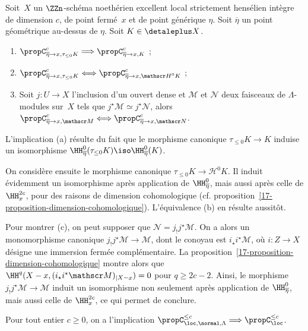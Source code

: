 \documentclass[10pt]{../fichiers-configuration-latex/smfart}
\begin{document}
\begin{lemme2}\label{17-lemme-propriete-c-reductions}
Soit $X$ un $\ZZn$-schéma noethérien excellent local strictement hensélien
intègre de dimension $c$,
de point fermé $x$ et de point générique $\eta$. Soit $\overline
\eta$ un point géométrique au-dessus de $\eta$. Soit $K\in\detaleplus X$.
\begin{enumerate}
\item[(a)] $\propC^c_{\overline\eta\to x,\tau_{\leq 0}K}\Longrightarrow
\propC^c_{\overline\eta\to x,K}$ ;
\item[(b)] $\propC^c_{\overline\eta\to x,\tau_{\leq 0}K}\Longleftrightarrow
\propC^c_{\overline\eta\to x,{\mathscr H}^0K}$ ;
\item[(c)] Soit $j\colon U\to X$ l'inclusion d'un ouvert dense
et $\mathscr M$ et $\mathscr N$ deux faisceaux de
$\Lambda$-modules sur $X$ tels que $j^\star \mathscr M\simeq j^\star
\mathscr N$, alors 
$\propC^c_{\overline\eta\to x,\mathscr M}\Longleftrightarrow
\propC^c_{\overline\eta\to x,\mathscr N}$.
\end{enumerate}
\end{lemme2}

L'implication (a) résulte du fait que le morphisme canonique $\tau_{\leq
0}K\to K$ induise un isomorphisme $\HH^0_{\overline \eta}(\tau_{\leq
0}K)\iso \HH^0_{\overline \eta}(K)$.

On considère ensuite le morphisme canonique
$\tau_{\leq 0}K\to {\mathscr H}^0 K$. Il induit évidemment un isomorphisme
après application de $\HH^0_{\overline \eta}$, mais aussi après celle de
$\HH^{2c}_{x}$, pour des raisons de dimension cohomologique (cf.
proposition~\ref{17-proposition-dimension-cohomologique}). L'équivalence (b)
en résulte aussitôt.

Pour montrer (c), on peut supposer que $\mathscr N=j_!j^\star \mathscr M$.
On a alors un monomorphisme canonique $j_!j^\star \mathscr M\to\mathscr M$,
dont le conoyau est $i_\star i^\star\mathscr M$, où $i\colon Z\to X$
désigne une immersion fermée complémentaire. La
proposition~\ref{17-proposition-dimension-cohomologique} montre alors que
$\HH^q(X-x,(i_\star i^\star\mathscr M)_{|X-x})=0$ pour $q\geq 2c-2$. Ainsi,
le morphisme $j_!j^\star \mathscr M\to\mathscr M$ induit un isomorphisme
non seulement après application de $\HH^0_{\overline \eta}$, mais aussi celle
de $\HH^{2c}_x$, ce qui permet de conclure.

\begin{lemme2}\label{17-lemme-reduction-propriete-c-faisceau-constant}
Pour tout entier $c\geq 0$, on a l'implication $\propC^{\leq
c}_{\loc,\normal,\Lambda}\Longrightarrow \propC^{\leq c}_{\loc}$.
\end{lemme2}
\end{document}

